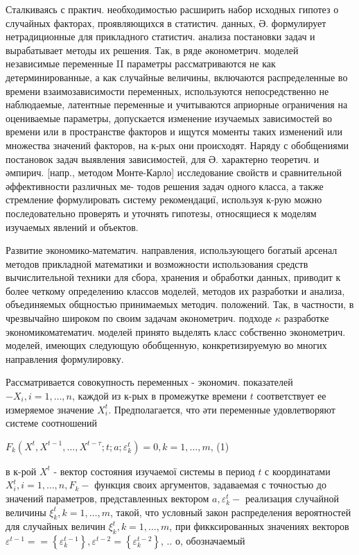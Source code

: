 \documentclass[10pt]{article}
\begin{document}
Сталкиваясь с практич. необходимостью расширить набор исходных гипотез о случайных факторах, проявляющихся в статистич. данных, Ә. формулирует нетрадиционные для прикладного статистич. анализа постановки задач и вырабатывает методы их решения. Так, в ряде әконометрич. моделей независимые переменные II параметры рассматриваются не как детерминированные, а как случайные величины, включаются распределенные во времени взаимозависимости переменных, используются непосредственно не наблюдаемые, латентные переменные и учитываются априорные ограничения на оцениваемые параметры, допускается изменение изучаемых зависимостей во времени или в пространстве факторов и ищутся моменты таких изменений или множества значений факторов, на к-рых они происходят. Наряду с обобщениями постановок задач выявления зависимостей, для Ә. характерно теоретич. и әмпирич. [напр., методом Монте-Карло] исследование свойств и сравнительной әффективности различных ме- тодов решения задач одного класса, а также стремление формулировать систему рекомендациї, используя к-рую можно последовательно проверять и уточнять гипотезы, относящиеся к моделям изучаемых явлений и объектов.



Развитие экономико-математич. направления, использующего богатый арсенал методов прикладной математики и возможности использования средств вычислительной техники для сбора, хранения и обработки данных, приводит к более четкому определению классов моделей, методов их разработки и анализа, объединяемых общностью принимаемых методич. положений. Так, в частности, в чрезвычайно широком по своим задачам әконометрич. подходе $\kappa$ разработке экономикоматематич. моделей принято выделять класс собственно эконометрич. моделей, имеющих следующую обобщенную, конкретизируемую во многих направления формулировку.



Рассматривается совокупность переменных - экономич. показателей $-X_{i}, i=1, \ldots, n$, каждой из к-рых в промежутке времени $t$ соответствует ее измеряемое значение $X_{i}^{t}$. Предполагается, что әти переменные удовлетворяют системе соотношений



$F_{k}\left(X^{t}, X^{t-1}, \ldots, X^{t-\tau} ; t ; a ; \varepsilon_{k}^{t}\right)=0, k=1, \ldots, m$, (1)



в к-рой $X^{t}$ - вектор состояния изучаемої системы в период $t$ с координатами $X_{i}^{t}, i=1, \ldots, n, F_{k}-$ функция своих аргументов, задаваемая с точностью до значений параметров, представленных вектором $a, \varepsilon_{k}^{t}-$ реализация случайной величины $\xi_{k}^{t}, k=1, \ldots, m$, такой, что условный закон распределения вероятностей для случайных величин $\xi_{k}^{t}, k=1, \ldots, m$, при фикксированных значениях векторов $\varepsilon^{t-1}==\left\{\varepsilon_{k}^{t-1}\right\}, \varepsilon^{t-2}=\left\{\varepsilon_{k}^{t-2}\right\}$, .. о, обозначаемый
\end{document}
